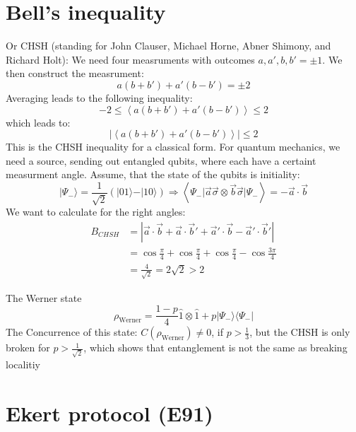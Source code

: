 \documentclass[12pt]{book}
\theoremstyle{definition}
\renewcommand{\v}[1]{\vec{#1}}
\newcommand{\scalar}[1]{\left\langle {#1}\right\rangle}
\newcommand{\abs}[1]{\left\vert {#1}\right\vert}
\newcommand{\si}{\sigma}
\newcommand{\para}[1]{\left( {#1} \right)}
\newcommand{\bra}[1]{\langle {#1} \vert}
\newcommand{\ket}[1]{\vert {#1} \rangle}
\begin{document}
\section{Bell's inequality}
Or CHSH (standing for John Clauser, Michael Horne, Abner Shimony, and Richard Holt): We need four measruments with outcomes $a, a', b, b' = \pm 1$. We then construct the measrument:
\begin{equation}
  a (b + b') + a' (b - b') = \pm 2
\end{equation}
Averaging leads to the following inequality:
\begin{equation*}
  -2 \leq \scalar{a (b + b') + a' (b - b')} \leq 2
\end{equation*}
which leads to:
\begin{equation*}
  \abs{\scalar{a (b + b') + a' (b - b')}} \leq 2
\end{equation*}
This is the CHSH inequality for a classical form. For quantum mechanics, we need a source, sending out entangled qubits, where each have a certaint measurment angle. Assume, that the state of the qubits is initiality:
\begin{equation*}
  \ket{\Psi_-} = \frac{1}{\sqrt{2}} \para{\ket{01} - \ket{10}} \Longrightarrow \scalar{\Psi_- \vert \v a \v \si \otimes \v b \v \si \vert \Psi_-} = - \v a \cdot \v b
\end{equation*}
We want to calculate for the right angles:
\begin{align*}
  B_{CHSH} & = \abs{\v a \cdot \v b + \v a \cdot \v b' + \v a' \cdot \v b - \v a' \cdot \v b'} \\
  & = \cos \frac{\pi}{4} + \cos \frac{\pi}{4} + \cos \frac{\pi}{4} - \cos \frac{3\pi}{4} \\
  & = \frac{4}{\sqrt{2}} = 2 \sqrt{2} > 2
\end{align*}

The Werner state
\begin{equation}
  \rho_{\textrm{Werner}} = \frac{1 - p}{4} \hat 1 \otimes \hat 1 + p \ket{\Psi_-} \bra{\Psi_-}
\end{equation}
The Concurrence of this state: $C(\rho_{\textrm{Werner}}) \neq 0$, if $p > \frac{1}{3}$, but the CHSH is only broken for $p > \frac{1}{\sqrt{2}}$, which shows that entanglement is not the same as breaking localitiy


\section{Ekert protocol (E91)}
\end{document}
